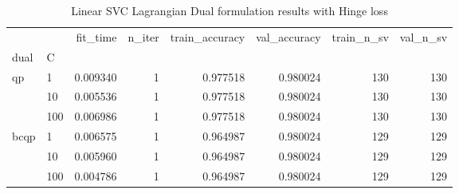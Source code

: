 \begin{table}[H]
\centering
\caption{Linear SVC Lagrangian Dual formulation results with Hinge loss}
\label{linear_lagrangian_dual_svc_cv_results}
\begin{tabular}{llrrrrrr}
\toprule
     &     &  fit\_time &  n\_iter &  train\_accuracy &  val\_accuracy &  train\_n\_sv &  val\_n\_sv \\
dual & C &           &         &                 &               &             &           \\
\midrule
qp & 1   &  0.009340 &       1 &        0.977518 &      0.980024 &         130 &       130 \\
     & 10  &  0.005536 &       1 &        0.977518 &      0.980024 &         130 &       130 \\
     & 100 &  0.006986 &       1 &        0.977518 &      0.980024 &         130 &       130 \\
bcqp & 1   &  0.006575 &       1 &        0.964987 &      0.980024 &         129 &       129 \\
     & 10  &  0.005960 &       1 &        0.964987 &      0.980024 &         129 &       129 \\
     & 100 &  0.004786 &       1 &        0.964987 &      0.980024 &         129 &       129 \\
\bottomrule
\end{tabular}
\end{table}
